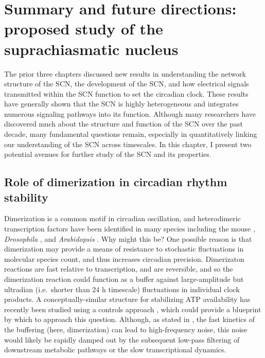 \chapter{Summary and future directions: proposed study of the suprachiasmatic nucleus}


The prior three chapters discussed new results in understanding the network structure of the SCN, the development of the SCN, and how electrical signals transmitted within the SCN function to set the circadian clock.
These results have generally shown that the SCN is highly heterogeneous and integrates numerous signaling pathways into its function.
Although many researchers have discovered much about the structure and function of the SCN over the past decade, many fundamental questions remain, especially in quantitatively linking our understanding of the SCN across timescales.
In this chapter, I present two potential avenues for further study of the SCN and its properties.


\section{Role of dimerization in circadian rhythm stability}
Dimerization is a common motif in circadian oscillation, and heterodimeric transcription factors have been identified in many species including the mouse \cite{Ko2006}, \textit{Drosophila} \cite{Darlington1998}, and \textit{Arabidopsis} \cite{McClung2006b}.
Why might this be?
One possible reason is that dimerization may provide a means of resistance to stochastic fluctuations in molecular species count, and thus increases circadian precision.
Dimerizaton reactions are fast relative to transcription, and are reversible, and so the dimerization reaction could function as a buffer against large-amplitude but ultradian (i.e.\ shorter than 24 h timescale) fluctuations in individual clock products.
A conceptually-similar structure for stabilizing ATP availability has recently been studied using a controls approach \cite{Hancock2017}, which could provide a blueprint by which to approach this question.
Although, as stated in \cite{Hancock2017}, the fast kinetics of the buffering (here, dimerization) can lead to high-frequency noise, this noise would likely be rapidly damped out by the subsequent low-pass filtering of downstream metabolic pathways or the slow transcriptional dynamics.

